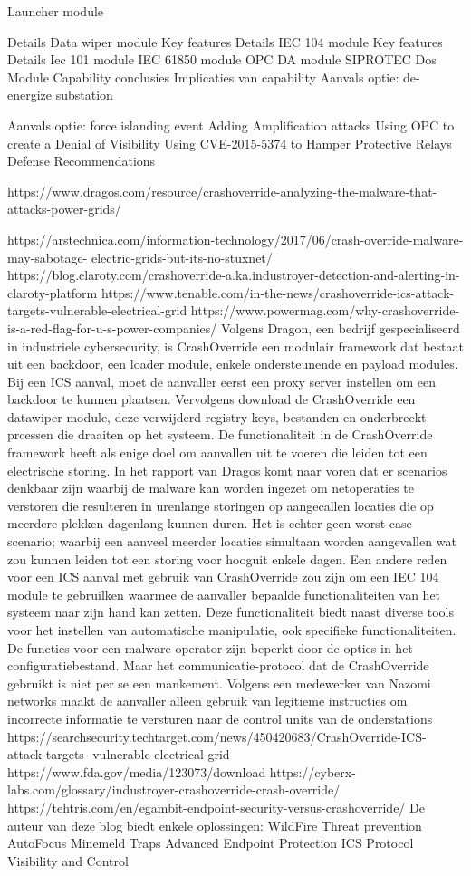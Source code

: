 {Launcher module

Details
Data wiper module
Key features
Details
IEC 104 module
Key features
Details
Iec 101 module
IEC 61850 module
OPC DA module
SIPROTEC Dos Module
Capability conclusies
Implicaties van capability
Aanvals optie: de-energize substation

Aanvals optie: force islanding event
Adding Amplification attacks
Using OPC to create a Denial of Visibility
Using CVE-2015-5374 to Hamper Protective Relays
Defense Recommendations

https://www.dragos.com/resource/crashoverride-analyzing-the-malware-that-attacks-power-grids/


https://arstechnica.com/information-technology/2017/06/crash-override-malware-may-sabotage-
electric-grids-but-its-no-stuxnet/
https://blog.claroty.com/crashoverride-a.ka.industroyer-detection-and-alerting-in-claroty-platform
https://www.tenable.com/in-the-news/crashoverride-ics-attack-targets-vulnerable-electrical-grid
https://www.powermag.com/why-crashoverride-is-a-red-flag-for-u-s-power-companies/
Volgens Dragon, een bedrijf gespecialiseerd in industriele cybersecurity, is CrashOverride een
modulair framework dat bestaat uit een backdoor, een loader module, enkele ondersteunende en
payload modules. Bij een ICS aanval, moet de aanvaller eerst een proxy server instellen om een
backdoor te kunnen plaatsen. Vervolgens download de CrashOverride een datawiper module, deze
verwijderd registry keys, bestanden en onderbreekt prcessen die draaiten op het systeem.
De functionaliteit in de CrashOverride framework heeft als enige doel om aanvallen uit te voeren die
leiden tot een electrische storing. In het rapport van Dragos komt naar voren dat er scenarios
denkbaar zijn waarbij de malware kan worden ingezet om netoperaties te verstoren die resulteren in
urenlange storingen op aangecallen locaties die op meerdere plekken dagenlang kunnen duren. Het
is echter geen worst-case scenario; waarbij een aanveel meerder locaties simultaan worden
aangevallen wat zou kunnen leiden tot een storing voor hooguit enkele dagen.
Een andere reden voor een ICS aanval met gebruik van CrashOverride zou zijn om een IEC 104
module te gebruilken waarmee de aanvaller bepaalde functionaliteiten van het systeem naar zijn
hand kan zetten.
Deze functionaliteit biedt naast diverse tools voor het instellen van automatische manipulatie, ook
specifieke functionaliteiten. De functies voor een malware operator zijn beperkt door de opties in het
configuratiebestand.
Maar het communicatie-protocol dat de CrashOverride gebruikt is niet per se een mankement.
Volgens een medewerker van Nazomi networks maakt de aanvaller alleen gebruik van legitieme
instructies om incorrecte informatie te versturen naar de control units van de onderstations
https://searchsecurity.techtarget.com/news/450420683/CrashOverride-ICS-attack-targets-
vulnerable-electrical-grid
https://www.fda.gov/media/123073/download
https://cyberx-labs.com/glossary/industroyer-crashoverride-crash-override/
https://tehtris.com/en/egambit-endpoint-security-versus-crashoverride/
De auteur van deze blog biedt enkele oplossingen:
WildFire
Threat prevention
AutoFocus
Minemeld
Traps Advanced Endpoint Protection
ICS Protocol Visibility and Control

}

